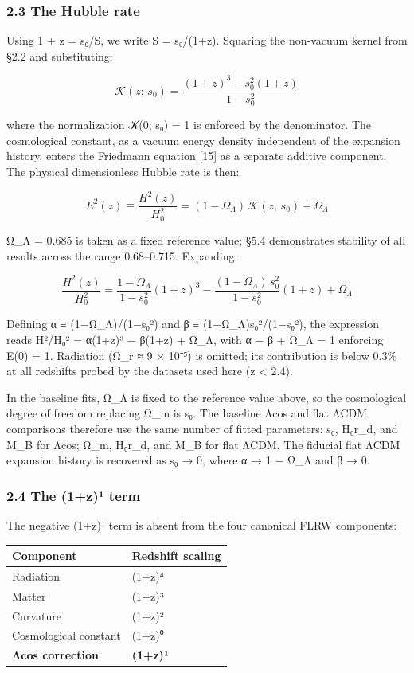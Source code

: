\subsubsection{2.3 The Hubble rate}\label{the-hubble-rate}

Using 1 + z = s₀/S, we write S = s₀/(1+z). Squaring the non-vacuum
kernel from §2.2 and substituting:

\[\mathcal{K}(z;\,s_0) = \frac{(1+z)^3 - s_0^2(1+z)}{1 - s_0^2}\]

where the normalization 𝒦(0; s₀) = 1 is enforced by the denominator. The
cosmological constant, as a vacuum energy density independent of the
expansion history, enters the Friedmann equation {[}15{]} as a separate
additive component. The physical dimensionless Hubble rate is then:

\[E^2(z) \equiv \frac{H^2(z)}{H_0^2} = (1 - \Omega_\Lambda)\,\mathcal{K}(z;\,s_0) + \Omega_\Lambda\]

Ω\_Λ = 0.685 is taken as a fixed reference value; §5.4 demonstrates
stability of all results across the range 0.68--0.715. Expanding:

\[\frac{H^2(z)}{H_0^2} = \frac{1 - \Omega_\Lambda}{1 - s_0^2}(1+z)^3 - \frac{(1 - \Omega_\Lambda)\,s_0^2}{1 - s_0^2}(1+z) + \Omega_\Lambda\]

Defining α ≡ (1−Ω\_Λ)/(1−s₀²) and β ≡ (1−Ω\_Λ)s₀²/(1−s₀²), the
expression reads H²/H₀² = α(1+z)³ − β(1+z) + Ω\_Λ, with α − β + Ω\_Λ = 1
enforcing E(0) = 1. Radiation (Ω\_r ≈ 9 × 10⁻⁵) is omitted; its
contribution is below 0.3\% at all redshifts probed by the datasets used
here (z \textless{} 2.4).

In the baseline fits, Ω\_Λ is fixed to the reference value above, so the
cosmological degree of freedom replacing Ω\_m is s₀. The baseline Λcos
and flat ΛCDM comparisons therefore use the same number of fitted
parameters: s₀, H₀r\_d, and M\_B for Λcos; Ω\_m, H₀r\_d, and M\_B for
flat ΛCDM. The fiducial flat ΛCDM expansion history is recovered as s₀ →
0, where α → 1 − Ω\_Λ and β → 0.

\subsubsection{2.4 The (1+z)¹ term}\label{the-1zuxb9-term}

The negative (1+z)¹ term is absent from the four canonical FLRW
components:

{\def\LTcaptype{none} %
\begin{longtable}[]{@{}ll@{}}
\toprule\noalign{}
Component & Redshift scaling \\
\midrule\noalign{}
\endhead
\bottomrule\noalign{}
\endlastfoot
Radiation & (1+z)⁴ \\
Matter & (1+z)³ \\
Curvature & (1+z)² \\
Cosmological constant & (1+z)⁰ \\
\textbf{Λcos correction} & \textbf{(1+z)¹} \\
\end{longtable}
}


